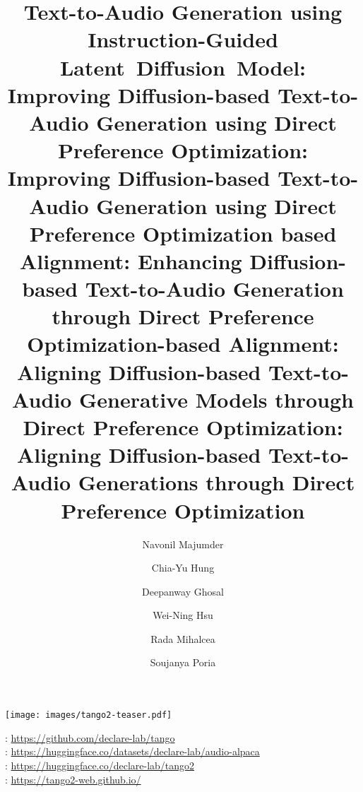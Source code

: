 \title{Text-to-Audio Generation using Instruction-Guided Latent~Diffusion~Model}



\title{\modeltitle{}: Improving Diffusion-based Text-to-Audio Generation using Direct Preference Optimization}

\title{\modeltitle{}: Improving Diffusion-based Text-to-Audio Generation using Direct Preference Optimization based Alignment}

\title{\modeltitle{}: Enhancing Diffusion-based Text-to-Audio Generation through Direct Preference Optimization-based Alignment}

\title{\modeltitle{}: Aligning Diffusion-based Text-to-Audio Generative Models through Direct Preference Optimization}

\title{\modeltitle{}: Aligning Diffusion-based Text-to-Audio Generations through Direct Preference Optimization}

\author{Navonil Majumder}

\author{Chia-Yu Hung}
\authornotemark[1]

\author{Deepanway Ghosal}
\authornotemark[1]

\author{Wei-Ning Hsu}

\author{Rada Mihalcea}

\author{Soujanya Poria}

 \begin{teaserfigure}
 \centering
\begin{minipage}[t]{\linewidth}
  \begin{center}
    \texttt{[image: images/tango2-teaser.pdf]}
  \end{center}
\end{minipage}
\vspace{0.3cm}
\begin{minipage}[t]{\linewidth}
  \centering
  \faGithub: \textcolor{red}{\url{https://github.com/declare-lab/tango}} \\
  \faDatabase: \textcolor{blue}{\url{https://huggingface.co/datasets/declare-lab/audio-alpaca}}\\
  \faAnchor: \textcolor{green}{\url{https://huggingface.co/declare-lab/tango2}}\\
  \faGlobe : \textcolor{magenta}{\url{https://tango2-web.github.io/}}
\end{minipage}\end{teaserfigure}

